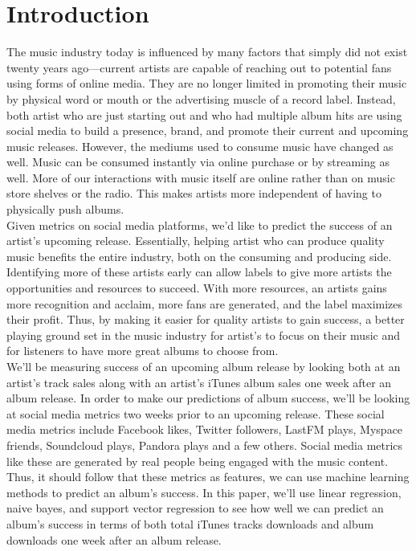 \documentclass[conference]{IEEEtran}
\begin{document}
\section{Introduction}
The music industry today is influenced by many factors that simply did not exist twenty years ago---current artists are capable of reaching out to potential fans using forms of online media. They are no longer limited in promoting their music by physical word or mouth or the advertising muscle of a record label. Instead, both artist who are just starting out and who had multiple album hits are using social media to build a presence, brand, and promote their current and upcoming music releases. However, the mediums used to consume music have changed as well. Music can be consumed instantly via online purchase or by streaming as well. More of our interactions with music itself are online rather than on music store shelves or the radio. This makes artists more independent of having to physically push albums.\\

Given metrics on social media platforms, we'd like to predict the success of an artist's upcoming release. Essentially, helping artist who can produce quality music benefits the entire industry, both on the consuming and producing side. Identifying more of these artists early can allow labels to give more artists the opportunities and resources to succeed. With more resources, an artists gains more recognition and acclaim, more fans are generated, and the label maximizes their profit. Thus, by making it easier for quality artists to gain success, a better playing ground set in the music industry for artist's to focus on their music and for listeners to have more great albums to choose from.\\

We'll be measuring success of an upcoming album release by looking both at an artist's track sales along with an artist's iTunes album sales one week after an album release. In order to make our predictions of album success, we'll be looking at social media metrics two weeks prior to an upcoming release. These social media metrics include Facebook likes, Twitter followers, LastFM plays, Myspace friends, Soundcloud plays, Pandora plays and a few others. Social media metrics like these are generated by real people being engaged with the music content. Thus, it should follow that these metrics as features, we can use machine learning methods to predict an album's success. In this paper, we'll use linear regression, naive bayes, and support vector regression to see how well we can predict an album's success in terms of both total iTunes tracks downloads and album downloads one week after an album release.\\
\end{document}
